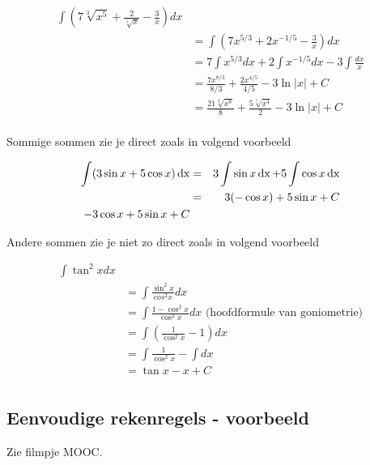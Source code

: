 \begin{voorbeeld}
	\begin{equation*}
	\begin{split}
	\int (7\sqrt[3]{x^5}+\frac{2}{\sqrt[5]{x}}-\frac{3}{x})dx\\
	&=\int (7x^{5/3}+2x^{-1/5}-\frac{3}{x})dx\\
	&=7\int x^{5/3}dx+2\int x^{-1/5}dx-3\int \frac{dx}{x}\\
	&= \frac{7x^{8/3}}{8/3}+\frac{2x^{4/5}}{4/5}-3\ln \vert x \vert +C\\
	&= \frac{21\sqrt[3]{x^8}}{8}+\frac{5\sqrt[5]{x^4}}{2}-3 \ln \vert x \vert +C\\
	\end{split}
	\end{equation*}
\end{voorbeeld}

Sommige sommen zie je direct zoals in volgend voorbeeld

\begin{voorbeeld} 
	\begin{eqnarray*}
	\int (3 \sin x + 5 \cos x) \operatorname{dx} &=& 3 \int \sin x \operatorname{dx} + 5 \int \cos x \operatorname{dx} \\
	&=& 3 (-\cos x ) + 5 \sin x +C \\
	-3 \cos x + 5 \sin x + C
	\end{eqnarray*}
\end{voorbeeld}

Andere sommen zie je niet zo direct zoals in volgend voorbeeld

\begin{voorbeeld}
	\begin{equation*}
	\begin{split}
	\int \tan ^2 x dx\\
	&=\int \frac{\sin^2 x}{cos ^2 x}dx\\
	&= \int \frac{1-\cos^2 x}{\cos ^2 x} dx \text { (hoofdformule van goniometrie)}\\
	&= \int \left( \frac{1}{\cos^2 x} -1 \right)dx\\
	&= \int \frac{1}{\cos ^2 x} - \int dx\\
	&= \tan x -x +C\\
	\end{split}
	\end{equation*}
\end{voorbeeld}

\subsection{Eenvoudige rekenregels - voorbeeld}
Zie filmpje MOOC.

